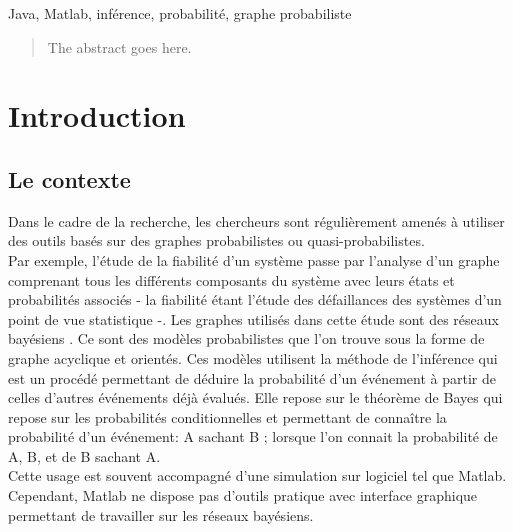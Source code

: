 \documentclass[conference]{IEEEtran}
\begin{document}




\maketitle



\begin{center}
Java, Matlab, inférence, probabilité, graphe probabiliste
\end{center}

\begin{abstract}
The abstract goes here.

\cite{murphyk}
\end{abstract}





%
\IEEEpeerreviewmaketitle


\section{Introduction}

\subsection{Le contexte}
Dans le cadre de la recherche, les chercheurs sont régulièrement amenés à utiliser des outils basés sur des graphes probabilistes ou quasi-probabilistes.\\
Par exemple, l'étude de la fiabilité d'un système passe par l'analyse d'un graphe comprenant tous les différents composants du système avec leurs états et probabilités associés - la fiabilité étant l'étude des défaillances des systèmes d'un point de vue statistique -. Les graphes utilisés dans cette étude sont des réseaux bayésiens \cite{kmurphy} \cite{Smail}. Ce sont des modèles probabilistes que l'on trouve sous la forme de graphe acyclique et orientés. Ces modèles utilisent la méthode de l'inférence qui est un procédé permettant de déduire la probabilité d'un événement à partir de celles d'autres événements déjà évalués. Elle repose sur le théorème de Bayes qui repose sur les probabilités conditionnelles et permettant de connaître la probabilité d'un événement:  A sachant B ; lorsque l'on connait la probabilité de A, B, et de B sachant A. \\
Cette usage est souvent accompagné d'une simulation sur logiciel tel que Matlab. Cependant, Matlab ne dispose pas d'outils pratique avec interface graphique permettant de travailler sur les réseaux bayésiens.
\end{document}
